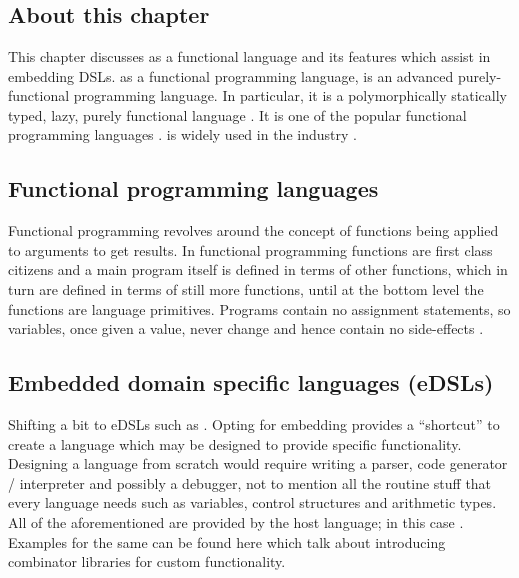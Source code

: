\documentclass[thesis-solanki.tex]{subfiles}
\begin{document}
\chapter{}\label{chap:hwh}


\section{About this chapter}
This chapter discusses  as a functional language and its features which assist in embedding DSLs.
 as a functional programming language, is an advanced purely-functional
programming language.
In particular, it is a polymorphically statically typed, lazy, purely functional language
\cite{website:haskellwiki}.
It is one of the popular functional programming languages \cite{website:langpop}.
 is widely used in the industry \cite{website:haskellinindustry}.
  
\section{Functional programming languages}
Functional programming revolves around the concept of functions being applied to arguments to get results.
In functional programming functions are first class citizens and a main program itself is defined in terms of other
functions, which in turn are defined in terms of still more functions, until at the bottom level the functions are
language primitives.
Programs contain no assignment statements, so variables, once given a value, never change and hence contain no
side-effects \cite{hughes1989functional}.


\section{Embedded domain specific languages (eDSLs)}
  Shifting a bit to eDSLs such as .
  Opting for embedding provides a ``shortcut'' to create a language which may be designed to provide specific
  functionality.
  Designing a language from scratch would require writing a parser, code generator / interpreter and possibly a
  debugger, not to mention all the routine stuff that every language
  needs such as variables, control structures and 
  arithmetic types.
  All of the aforementioned are provided by the host language; in this case .
  Examples for the same can be found here \cite{jones2001composing, meyer2008eiffel} which talk about introducing
  combinator libraries for custom functionality.
\end{document}
